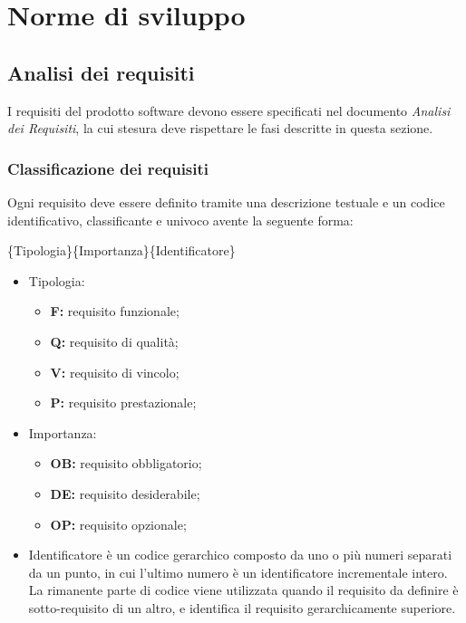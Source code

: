 \section{Norme di sviluppo}
\subsection{Analisi dei requisiti}
I requisiti del prodotto software devono essere specificati nel documento \emph{Analisi dei Requisiti}, la cui stesura deve rispettare le fasi descritte in questa sezione.

\subsubsection{Classificazione dei requisiti}
Ogni requisito deve essere definito tramite  una descrizione testuale e un codice identificativo, classificante e univoco avente la seguente forma:

\begin{center}\{Tipologia\}\{Importanza\}\{Identificatore\}\end{center}


\begin{itemize}

\item Tipologia:
\begin{itemize}
\item \textbf{F:} requisito funzionale;
\item \textbf{Q:} requisito di qualità;
\item \textbf{V:} requisito di vincolo;
\item \textbf{P:} requisito prestazionale;
\end{itemize}

\item Importanza:
\begin{itemize}
\item \textbf{OB:} requisito obbligatorio;
\item \textbf{DE:} requisito desiderabile;
\item \textbf{OP:} requisito opzionale;
\end{itemize}

\item Identificatore è un codice gerarchico composto da uno o più numeri separati da un punto, in cui l'ultimo numero è un identificatore incrementale intero.\\
La rimanente parte di codice viene utilizzata quando il requisito da definire è sotto-requisito di un altro, e identifica il requisito gerarchicamente superiore.

\end{itemize}

